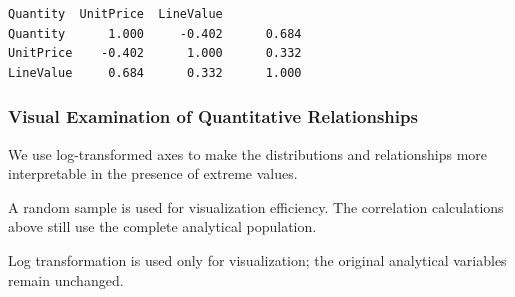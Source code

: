 \documentclass[11pt]{article}
\begin{document}
    
    \begin{Verbatim}[commandchars=\\\{\}]
           Quantity  UnitPrice  LineValue
Quantity      1.000     -0.402      0.684
UnitPrice    -0.402      1.000      0.332
LineValue     0.684      0.332      1.000
    \end{Verbatim}

    
    \subsubsection{Visual Examination of Quantitative
Relationships}\label{visual-examination-of-quantitative-relationships}

We use log-transformed axes to make the distributions and relationships
more interpretable in the presence of extreme values.

A random sample is used for visualization efficiency. The correlation
calculations above still use the complete analytical population.

Log transformation is used only for visualization; the original
analytical variables remain unchanged.
\end{document}
